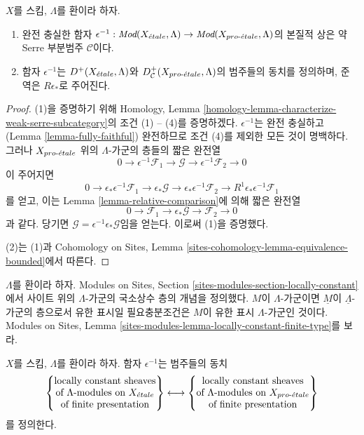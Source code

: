 \begin{lemma}
\label{lemma-compare-derived}
$X$를 스킴, $\Lambda$를 환이라 하자.
\begin{enumerate}
\item 완전 충실한 함자
$\epsilon^{-1} : \textit{Mod}(X_{\acute{e}tale}, \Lambda) \to
\textit{Mod}(X_{pro\text{-}\acute{e}tale}, \Lambda)$의 본질적 상은 약 Serre 부분범주
$\mathcal{C}$이다.
\item 함자 $\epsilon^{-1}$는 $D^+(X_{\acute{e}tale}, \Lambda)$와
$D^+_\mathcal{C}(X_{pro\text{-}\acute{e}tale}, \Lambda)$의 범주들의 동치를 정의하며,
준역은 $R\epsilon_*$로 주어진다.
\end{enumerate}
\end{lemma}

\begin{proof}
(1)을 증명하기 위해 Homology, Lemma
\ref{homology-lemma-characterize-weak-serre-subcategory}의 조건
(1) -- (4)를 증명하겠다. $\epsilon^{-1}$는 완전 충실하고
(Lemma \ref{lemma-fully-faithful}) 완전하므로 조건 (4)를 제외한 모든
것이 명백하다. 그러나 $X_{pro\text{-}\acute{e}tale}$ 위의 $\Lambda$-가군의 층들의
짧은 완전열
$$
0 \to \epsilon^{-1}\mathcal{F}_1 \to \mathcal{G} \to
\epsilon^{-1}\mathcal{F}_2 \to 0
$$
이 주어지면
$$
0 \to \epsilon_*\epsilon^{-1}\mathcal{F}_1 \to \epsilon_*\mathcal{G} \to
\epsilon_*\epsilon^{-1}\mathcal{F}_2 \to
R^1\epsilon_*\epsilon^{-1}\mathcal{F}_1
$$
를 얻고, 이는 Lemma \ref{lemma-relative-comparison}에 의해 짧은 완전열
$$
0 \to \mathcal{F}_1 \to \epsilon_*\mathcal{G} \to \mathcal{F}_2 \to 0
$$
과 같다.
당기면 $\mathcal{G} = \epsilon^{-1}\epsilon_*\mathcal{G}$임을 얻는다.
이로써 (1)을 증명했다.

\medskip\noindent
(2)는 (1)과 Cohomology on Sites, Lemma
\ref{sites-cohomology-lemma-equivalence-bounded}에서 따른다.
\end{proof}

\noindent
$\Lambda$를 환이라 하자. Modules on Sites, Section
\ref{sites-modules-section-locally-constant}에서 사이트 위의
$\Lambda$-가군의 국소상수 층의 개념을 정의했다. $M$이
$\Lambda$-가군이면 $\underline{M}$이 $\underline{\Lambda}$-가군의
층으로서 유한 표시일 필요충분조건은 $M$이 유한 표시
$\Lambda$-가군인 것이다. Modules on Sites, Lemma
\ref{sites-modules-lemma-locally-constant-finite-type}를 보라.

\begin{lemma}
\label{lemma-compare-locally-constant}
$X$를 스킴, $\Lambda$를 환이라 하자. 함자 $\epsilon^{-1}$는 범주들의
동치
$$
\left\{
\begin{matrix}
\text{locally constant sheaves}\\
\text{of }\Lambda\text{-modules on }X_{\acute{e}tale}\\
\text{of finite presentation}
\end{matrix}
\right\}
\longleftrightarrow
\left\{
\begin{matrix}
\text{locally constant sheaves}\\
\text{of }\Lambda\text{-modules on }X_{pro\text{-}\acute{e}tale}\\
\text{of finite presentation}
\end{matrix}
\right\}
$$
를 정의한다.
\end{lemma}

